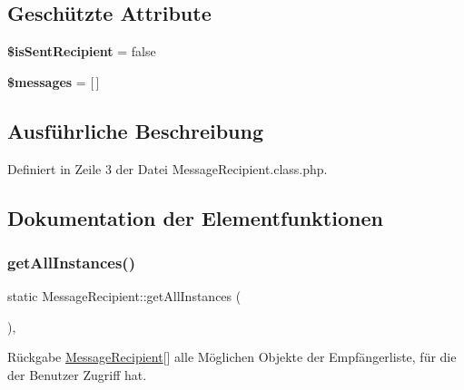 \subsection*{Geschützte Attribute}
\begin{DoxyCompactItemize}
\item 
\mbox{\label{class_message_recipient_a6bb3d5c13a5b2a111912aa05f6c1a4fa}} 
{\bfseries \$is\+Sent\+Recipient} = false
\item 
\mbox{\label{class_message_recipient_a32fdb5e6b3a0bc73934adc0dccf42b60}} 
{\bfseries \$messages} = \mbox{[}$\,$\mbox{]}
\end{DoxyCompactItemize}


\subsection{Ausführliche Beschreibung}


Definiert in Zeile 3 der Datei Message\+Recipient.\+class.\+php.



\subsection{Dokumentation der Elementfunktionen}
\mbox{\label{class_message_recipient_a97bf719f14b23c67217a57bc448ac782}} 
\subsubsection{\texorpdfstring{get\+All\+Instances()}{getAllInstances()}}
{\footnotesize\ttfamily static Message\+Recipient\+::get\+All\+Instances (\begin{DoxyParamCaption}{ }\end{DoxyParamCaption})\hspace{0.3cm}{\ttfamily [static]}, {\ttfamily [abstract]}}

\begin{DoxyReturn}{Rückgabe}
\mbox{\hyperlink{class_message_recipient}{Message\+Recipient}}\mbox{[}\mbox{]} alle Möglichen Objekte der Empfängerliste, für die der Benutzer Zugriff hat. 
\end{DoxyReturn}
\mbox{\label{class_message_recipient_a065ec30c3693ce595b8b1cd2a729ea68}} 
